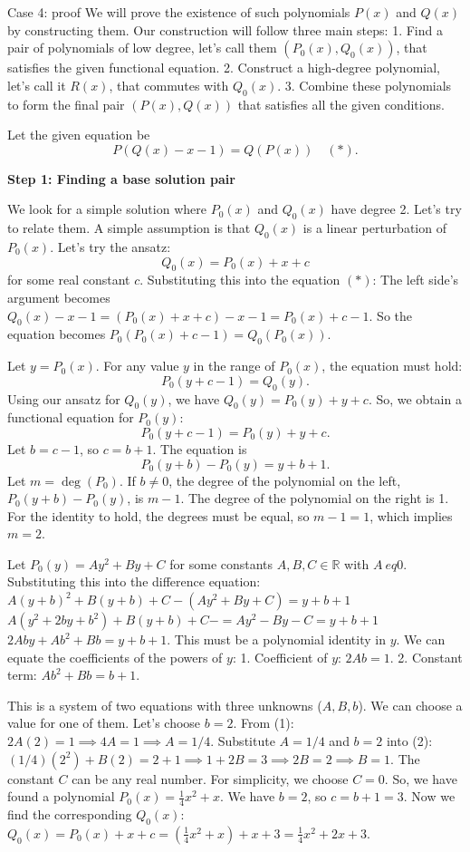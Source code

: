 \documentclass{article} %
\begin{document}
\begin{promptbox}{Case 4: proof}
  We will prove the existence of such polynomials $P(x)$ and $Q(x)$ by constructing them. Our construction will follow three main steps:
1. Find a pair of polynomials of low degree, let's call them $(P_0(x), Q_0(x))$, that satisfies the given functional equation.
2. Construct a high-degree polynomial, let's call it $R(x)$, that commutes with $Q_0(x)$.
3. Combine these polynomials to form the final pair $(P(x), Q(x))$ that satisfies all the given conditions.

Let the given equation be
\[P(Q(x)-x-1) = Q(P(x)) \quad (*).\]

\textbf{Step 1: Finding a base solution pair}

We look for a simple solution where $P_0(x)$ and $Q_0(x)$ have degree 2. Let's try to relate them. A simple assumption is that $Q_0(x)$ is a linear perturbation of $P_0(x)$. Let's try the ansatz:
\[Q_0(x) = P_0(x) + x + c\]
for some real constant $c$.
Substituting this into the equation $(*)$:
The left side's argument becomes $Q_0(x)-x-1 = (P_0(x)+x+c) - x - 1 = P_0(x)+c-1$.
So the equation becomes $P_0(P_0(x)+c-1) = Q_0(P_0(x))$.

Let $y = P_0(x)$. For any value $y$ in the range of $P_0(x)$, the equation must hold:
\[P_0(y+c-1) = Q_0(y).\]
Using our ansatz for $Q_0(y)$, we have $Q_0(y) = P_0(y) + y + c$.
So, we obtain a functional equation for $P_0(y)$:
\[P_0(y+c-1) = P_0(y) + y + c.\]
Let $b = c-1$, so $c = b+1$. The equation is
\[P_0(y+b) - P_0(y) = y+b+1.\]
Let $m = \deg(P_0)$. If $b \neq 0$, the degree of the polynomial on the left, $P_0(y+b) - P_0(y)$, is $m-1$. The degree of the polynomial on the right is 1.
For the identity to hold, the degrees must be equal, so $m-1 = 1$, which implies $m=2$.

Let $P_0(y) = Ay^2+By+C$ for some constants $A, B, C \in \mathbb{R}$ with $A \
eq 0$.
Substituting this into the difference equation:
$A(y+b)^2+B(y+b)+C - (Ay^2+By+C) = y+b+1$
$A(y^2+2by+b^2)+B(y+b)+C - =Ay^2-By-C = y+b+1$
$2Aby + Ab^2+Bb = y+b+1$.
This must be a polynomial identity in $y$. We can equate the coefficients of the powers of $y$:
1. Coefficient of $y$: $2Ab = 1$.
2. Constant term: $Ab^2+Bb = b+1$.

This is a system of two equations with three unknowns ($A, B, b$). We can choose a value for one of them. Let's choose $b=2$.
From (1): $2A(2) = 1 \implies 4A=1 \implies A=1/4$.
Substitute $A=1/4$ and $b=2$ into (2):
$(1/4)(2^2) + B(2) = 2+1 \implies 1+2B = 3 \implies 2B=2 \implies B=1$.
The constant $C$ can be any real number. For simplicity, we choose $C=0$.
So, we have found a polynomial $P_0(x) = \frac{1}{4}x^2+x$.
We have $b=2$, so $c=b+1=3$.
Now we find the corresponding $Q_0(x)$:
$Q_0(x) = P_0(x)+x+c = (\frac{1}{4}x^2+x) + x + 3 = \frac{1}{4}x^2+2x+3$.


\end{promptbox}
\end{document}
